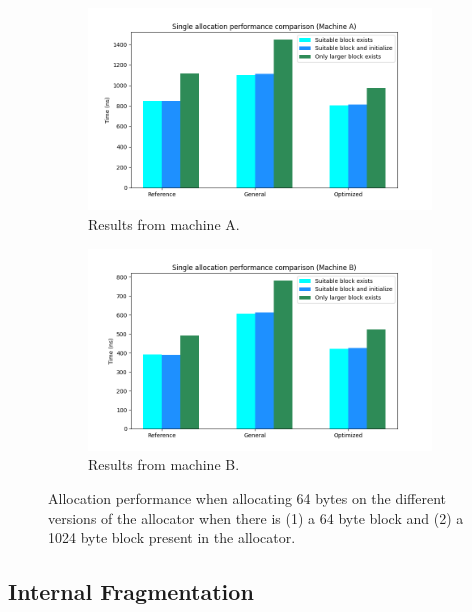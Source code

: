 \begin{figure}[]
    \centering
    \begin{subfigure}[b]{1\textwidth}
        \centering
        \includegraphics[width=\textwidth]{figures/allocation_performance_a.png}
        \caption{Results from machine A.}
        \label{fig:allocation_performance_a}
    \end{subfigure}
    \begin{subfigure}[b]{1\textwidth}
        \centering
        \includegraphics[width=\textwidth]{figures/allocation_performance_b.png}
        \caption{Results from machine B.}
        \label{fig:allocation_performance_b}
    \end{subfigure}
    \caption{Allocation performance when allocating 64 bytes on the different versions of the allocator when there is (1) a 64 byte block and (2) a 1024 byte block present in the allocator.}
    \label{fig:allocation_performance}
\end{figure}

\subsection{Internal Fragmentation}

